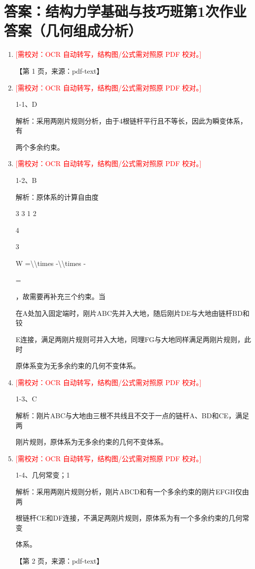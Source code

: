 \documentclass[UTF8,12pt,a4paper,openany]{ctexbook}
\newcommand{\TODO}[1]{\textcolor{red}{[需校对：#1]}}
\begin{document}
\section{答案：结构力学基础与技巧班第1次作业答案（几何组成分析）}
\begin{enumerate}[label=\textbf{\arabic*.},leftmargin=2em]
\item \TODO{OCR 自动转写，结构图/公式需对照原 PDF 校对。}\par 【第 1 页，来源：pdf-text】
\item \TODO{OCR 自动转写，结构图/公式需对照原 PDF 校对。}\par 1-1、D\par 解析：采用两刚片规则分析，由于4根链杆平行且不等长，因此为瞬变体系，有\par 两个多余约束。
\item \TODO{OCR 自动转写，结构图/公式需对照原 PDF 校对。}\par 1-2、B\par 解析：原体系的计算自由度\par 3 3 1 2\par 4\par 3\par W =\textbackslash{}\textbackslash{}times -\textbackslash{}\textbackslash{}times -\par =\par ，故需要再补充三个约束。当\par 在A处加入固定端时，刚片ABC先并入大地，随后刚片DE与大地由链杆BD和铰\par E连接，满足两刚片规则可并入大地，同理FG与大地同样满足两刚片规则，此时\par 原体系变为无多余约束的几何不变体系。
\item \TODO{OCR 自动转写，结构图/公式需对照原 PDF 校对。}\par 1-3、C\par 解析：刚片ABC与大地由三根不共线且不交于一点的链杆A、BD和CE，满足两\par 刚片规则，原体系为无多余约束的几何不变体系。
\item \TODO{OCR 自动转写，结构图/公式需对照原 PDF 校对。}\par 1-4、几何常变；1\par 解析：采用两刚片规则分析，刚片ABCD和有一个多余约束的刚片EFGH仅由两\par 根链杆CE和DF连接，不满足两刚片规则，原体系为有一个多余约束的几何常变\par 体系。\par \par 【第 2 页，来源：pdf-text】

\end{enumerate}
\end{document}
